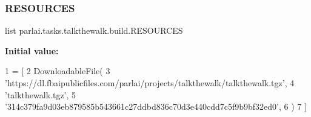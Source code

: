 \subsubsection{\texorpdfstring{R\+E\+S\+O\+U\+R\+C\+ES}{RESOURCES}}
{\footnotesize\ttfamily list parlai.\+tasks.\+talkthewalk.\+build.\+R\+E\+S\+O\+U\+R\+C\+ES}

{\bfseries Initial value\+:}
\begin{DoxyCode}
1 =  [
2     DownloadableFile(
3         \textcolor{stringliteral}{'https://dl.fbaipublicfiles.com/parlai/projects/talkthewalk/talkthewalk.tgz'},
4         \textcolor{stringliteral}{'talkthewalk.tgz'},
5         \textcolor{stringliteral}{'314c379fa9d03eb879585b543661c27ddbd836c70d3e440cdd7c5f9b9bf32ed0'},
6     )
7 ]
\end{DoxyCode}
